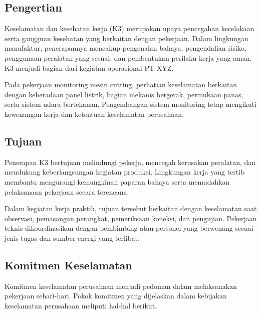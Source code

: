 \subsection{Pengertian}

Keselamatan dan kesehatan kerja (K3) merupakan upaya pencegahan kecelakaan serta gangguan kesehatan yang berkaitan dengan pekerjaan. Dalam lingkungan manufaktur, penerapannya mencakup pengenalan bahaya, pengendalian risiko, penggunaan peralatan yang sesuai, dan pembentukan perilaku kerja yang aman. K3 menjadi bagian dari kegiatan operasional PT XYZ.

Pada pekerjaan monitoring mesin cutting, perhatian keselamatan berkaitan dengan keberadaan panel listrik, bagian mekanis bergerak, permukaan panas, serta sistem udara bertekanan. Pengembangan sistem monitoring tetap mengikuti kewenangan kerja dan ketentuan keselamatan perusahaan.

\subsection{Tujuan}

Penerapan K3 bertujuan melindungi pekerja, mencegah kerusakan peralatan, dan mendukung keberlangsungan kegiatan produksi. Lingkungan kerja yang tertib membantu mengurangi kemungkinan paparan bahaya serta memudahkan pelaksanaan pekerjaan secara terencana.

Dalam kegiatan kerja praktik, tujuan tersebut berkaitan dengan keselamatan saat observasi, pemasangan perangkat, pemeriksaan koneksi, dan pengujian. Pekerjaan teknis dikoordinasikan dengan pembimbing atau personel yang berwenang sesuai jenis tugas dan sumber energi yang terlibat.

\subsection{Komitmen Keselamatan}

Komitmen keselamatan perusahaan menjadi pedoman dalam melaksanakan pekerjaan sehari-hari. Pokok komitmen yang dijelaskan dalam kebijakan keselamatan perusahaan meliputi hal-hal berikut.


